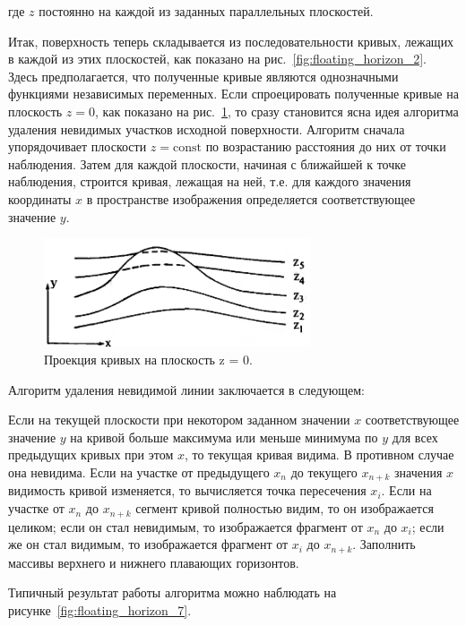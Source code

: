 где \( z \) постоянно на каждой из заданных параллельных плоскостей.

Итак, поверхность теперь складывается из последовательности кривых, лежащих в каждой из этих плоскостей, как показано на рис.~\ref{fig:floating_horizon_2}. Здесь предполагается, что полученные кривые являются однозначными функциями независимых переменных. Если спроецировать полученные кривые на плоскость \( z = 0 \), как показано на рис.~\ref{fig:floating_horizon_3}, то сразу становится ясна идея алгоритма удаления невидимых участков исходной поверхности. Алгоритм сначала упорядочивает плоскости \( z = \text{const} \) по возрастанию расстояния до них от точки наблюдения. Затем для каждой плоскости, начиная с ближайшей к точке наблюдения, строится кривая, лежащая на ней, т.е. для каждого значения координаты \( x \) в пространстве изображения определяется соответствующее значение \( y \).

\begin{figure}[H]
    \centering
    \includegraphics[width=0.7\textwidth]{img/floating_horizon_3.png}
    \caption{Проекция кривых на плоскость z = 0.}
    \label{fig:floating_horizon_3}
\end{figure}

Алгоритм удаления невидимой линии заключается в следующем:

Если на текущей плоскости при некотором заданном значении \( x \) соответствующее значение \( y \) на кривой больше максимума или меньше минимума по \( y \) для всех предыдущих кривых при этом \( x \), то текущая кривая видима. В противном случае она невидима. Если на участке от предыдущего \( x_n \) до текущего \( x_{n+k} \) значения \( x \) видимость кривой изменяется, то вычисляется точка пересечения \( x_i \). Если на участке от \( x_n \) до \( x_{n+k} \) сегмент кривой полностью видим, то он изображается целиком; если он стал невидимым, то изображается фрагмент от \( x_n \) до \( x_i \); если же он стал видимым, то изображается фрагмент от \( x_i \) до \( x_{n+k} \). Заполнить массивы верхнего и нижнего плавающих горизонтов.

Типичный результат работы алгоритма можно наблюдать на рисунке~\ref{fig:floating_horizon_7}.~\cite{rodgers}

